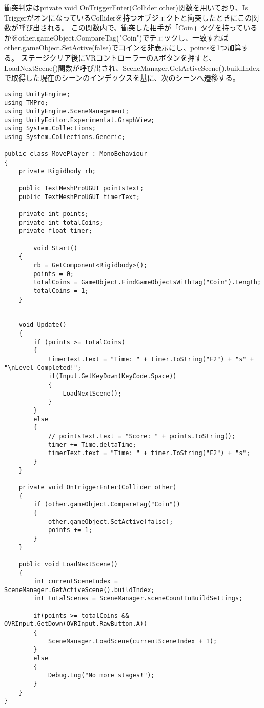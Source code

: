 \documentclass{jlreq}
\begin{document}
衝突判定はprivate void OnTriggerEnter(Collider other)関数を用いており、Is TriggerがオンになっているColliderを持つオブジェクトと衝突したときにこの関数が呼び出される。
この関数内で、衝突した相手が「Coin」タグを持っているかをother.gameObject.CompareTag("Coin")でチェックし、一致すればother.gameObject.SetActive(false)でコインを非表示にし、pointsを1つ加算する。
ステージクリア後にVRコントローラーのAボタンを押すと、LoadNextScene()関数が呼び出され、SceneManager.GetActiveScene().buildIndexで取得した現在のシーンのインデックスを基に、次のシーンへ遷移する。
\begin{lstlisting}
using UnityEngine;
using TMPro;
using UnityEngine.SceneManagement;
using UnityEditor.Experimental.GraphView;
using System.Collections;
using System.Collections.Generic;

public class MovePlayer : MonoBehaviour
{
    private Rigidbody rb;
    
    public TextMeshProUGUI pointsText;
    public TextMeshProUGUI timerText;

    private int points;
    private int totalCoins;
    private float timer;

        void Start()
    {
        rb = GetComponent<Rigidbody>();
        points = 0;
        totalCoins = GameObject.FindGameObjectsWithTag("Coin").Length;
        totalCoins = 1;
    }

  
    void Update()
    {
        if (points >= totalCoins)
        {
            timerText.text = "Time: " + timer.ToString("F2") + "s" + "\nLevel Completed!";
            if(Input.GetKeyDown(KeyCode.Space))
            {
                LoadNextScene();
            }
        }
        else
        {
            // pointsText.text = "Score: " + points.ToString();
            timer += Time.deltaTime;
            timerText.text = "Time: " + timer.ToString("F2") + "s";
        }
    }

    private void OnTriggerEnter(Collider other)
    {
        if (other.gameObject.CompareTag("Coin")) 
        {
            other.gameObject.SetActive(false);
            points += 1;
        }
    }

    public void LoadNextScene()
    {
        int currentSceneIndex = SceneManager.GetActiveScene().buildIndex;
        int totalScenes = SceneManager.sceneCountInBuildSettings;

        if(points >= totalCoins && OVRInput.GetDown(OVRInput.RawButton.A))
        {
            SceneManager.LoadScene(currentSceneIndex + 1);
        }
        else
        {
            Debug.Log("No more stages!");
        }
    }
}

\end{lstlisting}
\end{document}
